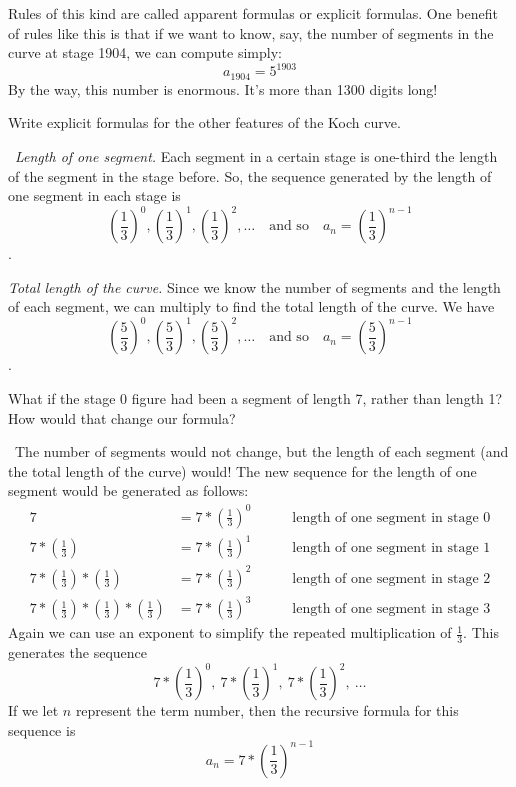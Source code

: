 Rules of this kind are called apparent formulas or explicit formulas. One benefit of rules like this is that if we want to know, say, the number of segments in the curve at stage 1904, we can compute simply: \[a_{1904} = 5^{1903}\]
By the way, this number is enormous. It's more than 1300 digits long!

\begin{boxedex}
Write explicit formulas for the other features of the Koch curve.

\exsoln\ \textit{Length of one segment.} Each segment in a certain stage is one-third the length of the segment in the stage before. So, the sequence generated by the length of one segment in each stage is \[\left(\frac{1}{3}\right)^0, \left(\frac{1}{3}\right)^1, \left(\frac{1}{3}\right)^2,\dotsc \quad\text{and so}\quad a_n = \left(\frac{1}{3}\right)^{n-1}\].

\textit{Total length of the curve.} Since we know the number of segments and the length of each segment, we can multiply to find the total length of the curve. We have \[\left(\frac{5}{3}\right)^0, \left(\frac{5}{3}\right)^1, \left(\frac{5}{3}\right)^2,\dotsc \quad\text{and so}\quad a_n = \left(\frac{5}{3}\right)^{n-1}\].
\end{boxedex}

\begin{boxedex}
What if the stage 0 figure had been a segment of length 7, rather than length 1? How would that change our formula?

\exsoln\ The number of segments would not change, but the length of each segment (and the total length of the curve) would! The new sequence for the length of one segment would be generated as follows:
\[\begin{aligned}
7 &=7\ast\left(\frac{1}{3}\right)^{0}
&& \quad\text{ length of one segment in stage 0}
\\
7 \ast\left(\frac{1}{3}\right) &= 7\ast\left(\frac{1}{3}\right)^{1}
&& \quad\text{ length of one segment in stage 1}
\\
7 \ast\left(\frac{1}{3}\right) \ast\left(\frac{1}{3}\right) &= 7\ast\left(\frac{1}{3}\right)^{2}
&& \quad\text{ length of one segment in stage 2}
\\
7 \ast\left(\frac{1}{3}\right) \ast\left(\frac{1}{3}\right) \ast\left(\frac{1}{3}\right) &= 7\ast\left(\frac{1}{3}\right)^{3}
&& \quad\text{ length of one segment in stage 3}
\end{aligned}\]Again we can use an exponent to simplify the repeated multiplication of $\frac{1}{3}$.
This generates the sequence
\[7\ast\left(\frac{1}{3}\right)^0, ~7\ast\left(\frac{1}{3}\right)^1, ~7\ast\left(\frac{1}{3}\right)^2, ~\dotsc\]
If we let $n$ represent the term number, then the recursive formula for this sequence is \[a_n = 7 \ast \left(\frac{1}{3}\right)^{n-1}\]
\end{boxedex}

